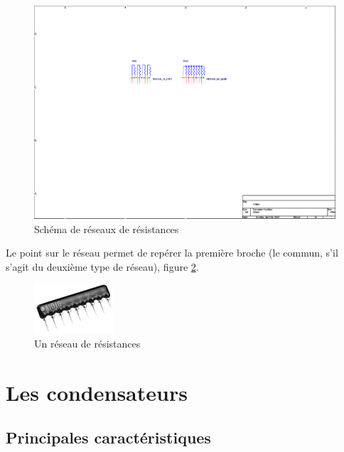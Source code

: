 \documentclass[a4paper]{article}
\begin{document}
\begin{figure}[H]
	\centering
	\includegraphics[scale=1.00]{Images/Reseaux_resistances_schema}
	\caption{Schéma de réseaux de résistances
		\label{Reseaux_resistances_schema}}
\end{figure}

Le point sur le réseau permet de repérer la première broche (le commun, s'il s'agit du deuxième type de réseau), figure \ref{Reseaux_resistances}.

\begin{figure}[H]
	\centering
	\includegraphics[scale=0.75]{Images/Reseaux_resistances.png}
	\caption{Un réseau de résistances
		\label{Reseaux_resistances}}
\end{figure}

\section{Les condensateurs}


\subsection{Principales caractéristiques}
\end{document}
